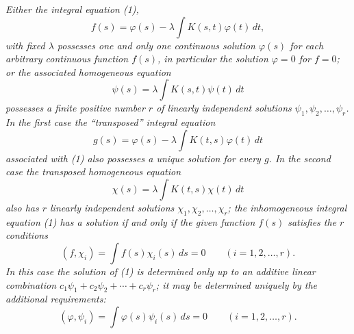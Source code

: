 \emph{Either the integral equation (1),}
\[
f(s)=\varphi(s)-\lambda\int K(s,t)\varphi(t)\,dt,
\]
\emph{with fixed $\lambda$ possesses one and only one continuous solution $\varphi(s)$ for each arbitrary continuous function $f(s)$, in particular the solution $\varphi=0$ for $f=0$; or the associated homogeneous equation}
\begin{equation}\tag{5}
\psi(s)=\lambda\int K(s,t)\psi(t)\,dt
\end{equation}
\emph{possesses a finite positive number $r$ of linearly independent solutions $\psi_1,\psi_2,\ldots,\psi_r$. In the first case the ``transposed'' integral equation}
\begin{equation}\tag{6}
g(s)=\varphi(s)-\lambda\int K(t,s)\varphi(t)\,dt
\end{equation}
\emph{associated with (1) also possesses a unique solution for every $g$. In the second case the transposed homogeneous equation}
\begin{equation}\tag{7}
\chi(s)=\lambda\int K(t,s)\chi(t)\,dt
\end{equation}
\emph{also has $r$ linearly independent solutions $\chi_1,\chi_2,\ldots,\chi_r$; the inhomogeneous integral equation (1) has a solution if and only if the given function $f(s)$ satisfies the $r$ conditions}
\begin{equation}\tag{8}
(f,\chi_i)=\int f(s)\chi_i(s)\,ds=0
\qquad (i=1,2,\ldots,r).
\end{equation}
\emph{In this case the solution of (1) is determined only up to an additive linear combination $c_1\psi_1+c_2\psi_2+\cdots+c_r\psi_r$; it may be determined uniquely by the additional requirements:}
\[
(\varphi,\psi_i)=\int\varphi(s)\psi_i(s)\,ds=0
\qquad (i=1,2,\ldots,r).
\]

